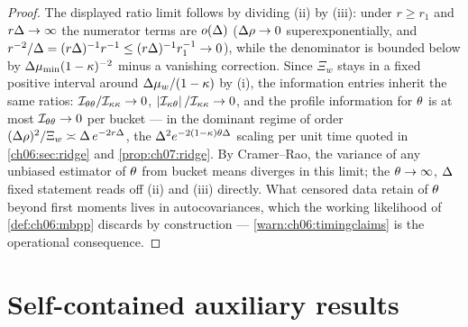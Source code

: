 \begin{proof}
The displayed ratio limit follows by dividing (ii) by (iii): under $r \ge r_1$ and $r\Delta \to
\infty$ the numerator terms are $o(\Delta)$ ($\Delta\rho \to 0$ superexponentially, and
$r^{-2}/\Delta = (r\Delta)^{-1} r^{-1} \le (r\Delta)^{-1} r_1^{-1} \to 0$), while the
denominator is bounded below by $\Delta \mu_{\min}(1-\kappa)^{-2}$ minus a vanishing correction.
Since $\Xi_w$ stays in a fixed positive interval around $\Delta\mu_w/(1-\kappa)$ by (i), the
information entries inherit the same ratios: $\mathcal{I}_{\theta\theta}/\mathcal{I}_{\kappa\kappa} \to 0$,
$\left|\mathcal{I}_{\kappa\theta}\right|/\mathcal{I}_{\kappa\kappa} \to 0$, and the profile information for
$\theta$ is at most $\mathcal{I}_{\theta\theta} \to 0$ per bucket --- in the dominant regime of order
$(\Delta\rho)^2/\Xi_w \asymp \Delta\, e^{-2r\Delta}$, the $\Delta^2
e^{-2(1-\kappa)\theta\Delta}$ scaling per unit time quoted in \cref{ch06:sec:ridge} and
\cref{prop:ch07:ridge}. By Cramer--Rao, the variance of any unbiased estimator of $\theta$ from
bucket means diverges in this limit; the $\theta \to \infty$, $\Delta$ fixed statement reads off
(ii) and (iii) directly. What censored data retain of $\theta$ beyond first moments lives in
autocovariances, which the working likelihood of \cref{def:ch06:mbpp} discards by construction ---
\cref{warn:ch06:timingclaims} is the operational consequence.
\end{proof}

\section{Self-contained auxiliary results}
\label{app:pf:auxiliary}

